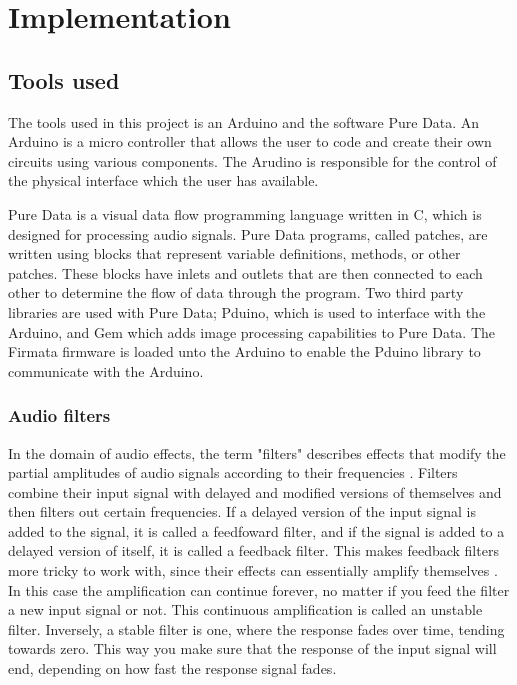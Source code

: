 \chapter{Implementation}\label{ch:implementation}

\section{Tools used}\label{sec:toolsused}
The tools used in this project is an Arduino and the software Pure Data. An Arduino is a micro controller that allows the user to code and create their own circuits using various components. The Arudino is responsible for the control of the physical interface which the user has available.

Pure Data is a visual data flow programming language \cite{puredata} written in C, which is designed for processing audio signals. Pure Data programs, called patches, are written using blocks that represent variable definitions, methods, or other patches. These blocks have inlets and outlets that are then connected to each other to determine the flow of data through the program. Two third party libraries are used with Pure Data; Pduino, which is used to interface with the Arduino, and Gem which adds image processing capabilities to Pure Data. The Firmata firmware is loaded unto the Arduino to enable the Pduino library to communicate with the Arduino.

\subsection{Audio filters}\label{sub:audiofilters}
In the domain of audio effects, the term "filters" describes effects that modify the partial amplitudes of audio signals according to their frequencies \cite{zolzer2011dafx}. Filters combine their input signal with delayed and modified versions of themselves and then filters out certain frequencies. If a delayed version of the input signal is added to the signal, it is called a feedfoward filter, and if the signal is added to a delayed version of itself, it is called a feedback filter. This makes feedback filters more tricky to work with, since their effects can essentially amplify themselves \cite{steiglitz1997digital}. In this case the amplification can continue forever, no matter if you feed the filter a new input signal or not. This continuous amplification is called an unstable filter. Inversely, a stable filter is one, where the response fades over time, tending towards zero. This way you make sure that the response of the input signal will end, depending on how fast the response signal fades.

